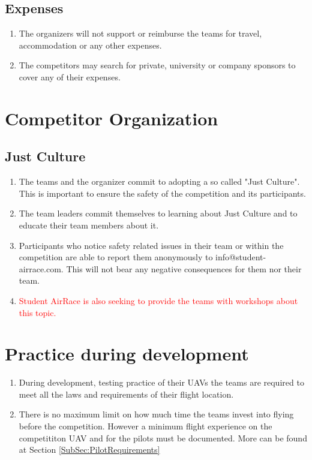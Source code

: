     \subsection{Expenses}
    \begin{enumerate}
      \item The organizers will not support or reimburse the teams for travel, accommodation or any other expenses. 
      \item The competitors may search for private, university or company sponsors to cover any of their expenses.
    \end{enumerate}

    \section{Competitor Organization}

    \subsection{Just Culture}
    \begin{enumerate}
      \item The teams and the organizer commit to adopting a so called "Just Culture". This is important to ensure the safety of the competition and its participants.
      \item The team leaders commit themselves to learning about Just Culture and to educate their team members about it.
      \item Participants who notice safety related issues in their team or within the competition are able to report them anonymously  to info@student-airrace.com. This will not bear any
      negative consequences for them nor their team. 
      \item \textcolor{red}{Student AirRace is also seeking to provide the teams with workshops about this topic.}
    \end{enumerate}

    \section{Practice during development}
    \begin{enumerate}
      \item During development, testing practice of their UAVs the teams are required to meet all the laws and requirements of their flight location. 
      \item There is no maximum limit on how much time the teams invest into flying before the competition. However a minimum flight experience on the competititon UAV and for the pilots must be documented. More can be found at Section \ref{SubSec:PilotRequirements}
    \end{enumerate}

